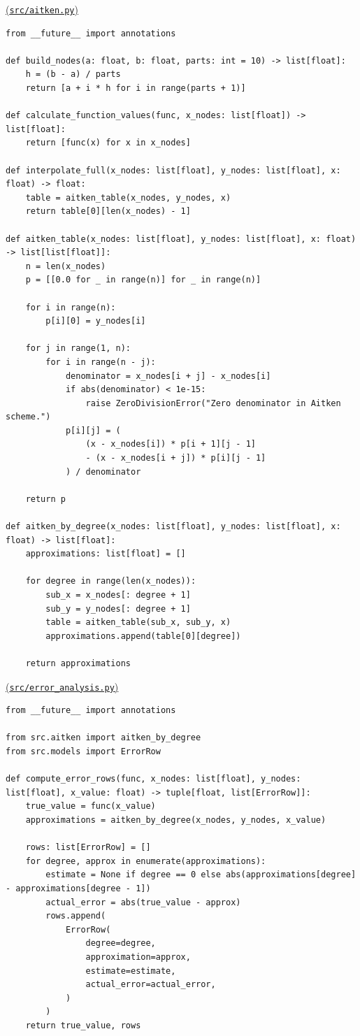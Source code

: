 \documentclass[12pt,a4paper]{article}
\begin{document}
    \noindent
    \underline{(\texttt{src/aitken.py})}

    \begin{verbatim}
from __future__ import annotations

def build_nodes(a: float, b: float, parts: int = 10) -> list[float]:
    h = (b - a) / parts
    return [a + i * h for i in range(parts + 1)]

def calculate_function_values(func, x_nodes: list[float]) -> list[float]:
    return [func(x) for x in x_nodes]

def interpolate_full(x_nodes: list[float], y_nodes: list[float], x: float) -> float:
    table = aitken_table(x_nodes, y_nodes, x)
    return table[0][len(x_nodes) - 1]

def aitken_table(x_nodes: list[float], y_nodes: list[float], x: float) -> list[list[float]]:
    n = len(x_nodes)
    p = [[0.0 for _ in range(n)] for _ in range(n)]

    for i in range(n):
        p[i][0] = y_nodes[i]

    for j in range(1, n):
        for i in range(n - j):
            denominator = x_nodes[i + j] - x_nodes[i]
            if abs(denominator) < 1e-15:
                raise ZeroDivisionError("Zero denominator in Aitken scheme.")
            p[i][j] = (
                (x - x_nodes[i]) * p[i + 1][j - 1]
                - (x - x_nodes[i + j]) * p[i][j - 1]
            ) / denominator

    return p

def aitken_by_degree(x_nodes: list[float], y_nodes: list[float], x: float) -> list[float]:
    approximations: list[float] = []

    for degree in range(len(x_nodes)):
        sub_x = x_nodes[: degree + 1]
        sub_y = y_nodes[: degree + 1]
        table = aitken_table(sub_x, sub_y, x)
        approximations.append(table[0][degree])

    return approximations
    \end{verbatim}

    \noindent
    \underline{(\texttt{src/error\_analysis.py})}

    \begin{verbatim}
from __future__ import annotations

from src.aitken import aitken_by_degree
from src.models import ErrorRow

def compute_error_rows(func, x_nodes: list[float], y_nodes: list[float], x_value: float) -> tuple[float, list[ErrorRow]]:
    true_value = func(x_value)
    approximations = aitken_by_degree(x_nodes, y_nodes, x_value)

    rows: list[ErrorRow] = []
    for degree, approx in enumerate(approximations):
        estimate = None if degree == 0 else abs(approximations[degree] - approximations[degree - 1])
        actual_error = abs(true_value - approx)
        rows.append(
            ErrorRow(
                degree=degree,
                approximation=approx,
                estimate=estimate,
                actual_error=actual_error,
            )
        )
    return true_value, rows
    \end{verbatim}
\end{document}
